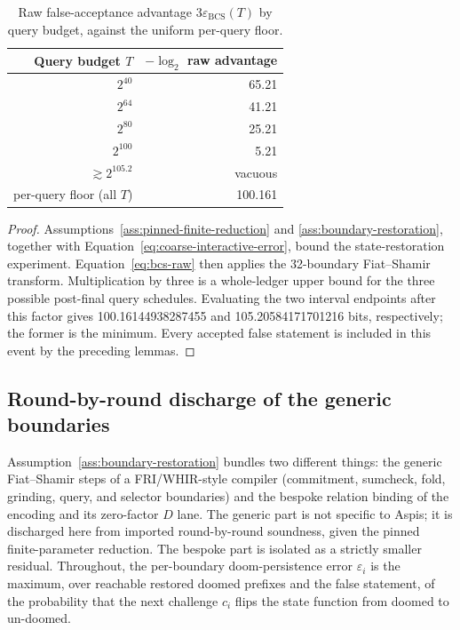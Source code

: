 \begin{table}[t]
  \centering
  \small
  \caption{Raw false-acceptance advantage \(3\varepsilon_{\mathrm{BCS}}(T)\)
  by query budget, against the uniform per-query floor.}
  \label{tab:raw-advantage}
  \begin{tabular}{r r}
    \toprule
    Query budget \(T\) & \(-\log_2\) raw advantage \\
    \midrule
    \(2^{40}\) & 65.21 \\
    \(2^{64}\) & 41.21 \\
    \(2^{80}\) & 25.21 \\
    \(2^{100}\) & 5.21 \\
    \(\gtrsim 2^{105.2}\) & vacuous \\
    \midrule
    per-query floor (all \(T\)) & 100.161 \\
    \bottomrule
  \end{tabular}
\end{table}

\begin{proof}
Assumptions~\ref{ass:pinned-finite-reduction} and
\ref{ass:boundary-restoration}, together with
Equation~\eqref{eq:coarse-interactive-error}, bound the state-restoration
experiment.  Equation~\eqref{eq:bcs-raw} then applies the 32-boundary
Fiat--Shamir transform.
Multiplication by three is a whole-ledger upper bound for the three possible
post-final query schedules.  Evaluating the two interval endpoints after this
factor gives 100.16144938287455 and 105.20584171701216 bits, respectively;
the former is the minimum.  Every accepted false statement is included in
this event by the preceding lemmas.
\end{proof}

\subsection{Round-by-round discharge of the generic boundaries}
\label{sec:rbr-discharge}

Assumption~\ref{ass:boundary-restoration} bundles two different things: the
generic Fiat--Shamir steps of a FRI/WHIR-style compiler (commitment,
sumcheck, fold, grinding, query, and selector boundaries) and the bespoke
relation binding of the \Profile{} encoding and its zero-factor \(D\) lane.
The generic part is not specific to Aspis; it is discharged here from imported
round-by-round soundness, given the pinned finite-parameter reduction.  The
bespoke part is isolated as a strictly smaller residual.  Throughout, the
per-boundary doom-persistence error \(\varepsilon_i\) is the maximum, over
reachable restored doomed prefixes and the false statement, of the probability
that the next challenge \(c_i\) flips the state function from doomed to
un-doomed.


